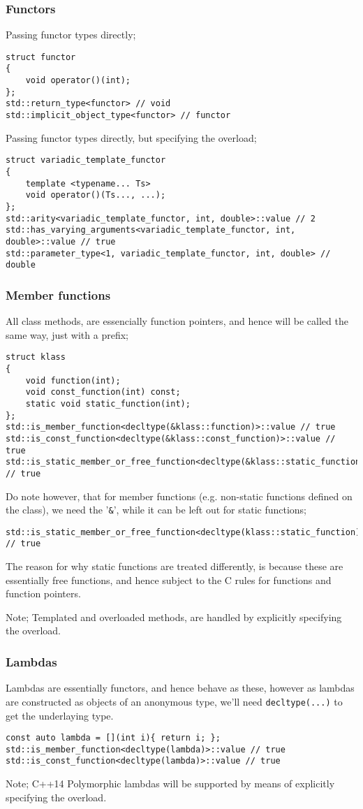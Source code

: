 \subsubsection{Functors}
Passing functor types directly;
\begin{verbatim}
struct functor
{
    void operator()(int);
};
std::return_type<functor> // void
std::implicit_object_type<functor> // functor
\end{verbatim}
Passing functor types directly, but specifying the overload;
\begin{verbatim}
struct variadic_template_functor
{
    template <typename... Ts>
    void operator()(Ts..., ...);
};
std::arity<variadic_template_functor, int, double>::value // 2
std::has_varying_arguments<variadic_template_functor, int, double>::value // true
std::parameter_type<1, variadic_template_functor, int, double> // double
\end{verbatim}

\subsubsection{Member functions}
All class methods, are essencially function pointers, and hence will be called
the same way, just with a prefix;
\begin{verbatim}
struct klass
{
    void function(int);
    void const_function(int) const;
    static void static_function(int);
};
std::is_member_function<decltype(&klass::function)>::value // true
std::is_const_function<decltype(&klass::const_function)>::value // true
std::is_static_member_or_free_function<decltype(&klass::static_function)>::value // true
\end{verbatim}
Do note however, that for member functions (e.g. non-static functions defined on
the class), we need the '\verb|&|', while it can be left out for static functions;
\begin{verbatim}
std::is_static_member_or_free_function<decltype(klass::static_function)>::value // true
\end{verbatim}
The reason for why static functions are treated differently, is because these
are essentially free functions, and hence subject to the C rules for functions
and function pointers. 

Note; Templated and overloaded methods, are handled by explicitly specifying the
overload.

\subsubsection{Lambdas}
Lambdas are essentially functors, and hence behave as these, however as lambdas
are constructed as objects of an anonymous type, we'll need \verb|decltype(...)|
to get the underlaying type.
\begin{verbatim}
const auto lambda = [](int i){ return i; };
std::is_member_function<decltype(lambda)>::value // true
std::is_const_function<decltype(lambda)>::value // true
\end{verbatim}
Note; C++14 Polymorphic lambdas will be supported by means of explicitly specifying the
overload.

